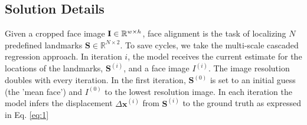 \documentclass[9pt,twocolumn]{extarticle}
\begin{document}



\subsection{Solution Details}

Given a cropped face image $\bold{I} \in \mathbb R^{w \times h}$, face alignment is the task of localizing $N$ predefined landmarks $\mathbf{S} \in \mathbb R^{N \times 2}$. To save cycles, we take the multi-scale cascaded regression approach. In iteration $i$, the model receives the current estimate for the locations of the landmarks, $\mathbf{S}^{(i)}$, and a face image $I^{(i)}$. The image resolution doubles with every iteration. In the first iteration, $\mathbf{S}^{(0)}$ is set to an initial guess (the 'mean face') and $I^{(0)}$ to the lowest resolution image. In each iteration the model infers the displacement $\Delta \mathbf{x}^{(i)}$ from $\mathbf{S}^{(i)}$ to the ground truth as expressed in Eq. \ref{eq:1}
\end{document}
